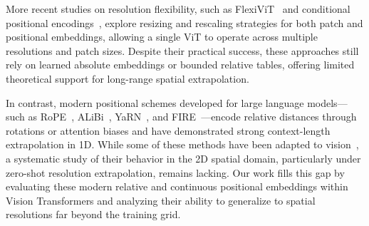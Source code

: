 More recent studies on resolution flexibility, such as FlexiViT~\cite{beyer2023flexivit} and conditional positional encodings~\cite{chu2023conditional}, explore resizing and rescaling strategies for both patch and positional embeddings, allowing a single ViT to operate across multiple resolutions and patch sizes. Despite their practical success, these approaches still rely on learned absolute embeddings or bounded relative tables, offering limited theoretical support for long-range spatial extrapolation.

In contrast, modern positional schemes developed for large language models—such as RoPE~\cite{su2024roformer}, ALiBi~\cite{press2022train}, YaRN~\cite{peng2024yarn}, and FIRE~\cite{li2024functional}---encode relative distances through rotations or attention biases and have demonstrated strong context-length extrapolation in 1D. While some of these methods have been adapted to vision~\cite{heo2024rope}, a systematic study of their behavior in the 2D spatial domain, particularly under zero-shot resolution extrapolation, remains lacking. Our work fills this gap by evaluating these modern relative and continuous positional embeddings within Vision Transformers and analyzing their ability to generalize to spatial resolutions far beyond the training grid.

